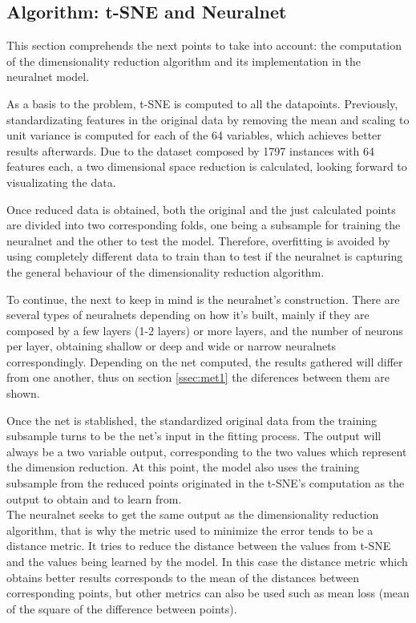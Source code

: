 \documentclass[a4paper,11pt,spanish]{report}
\begin{document}
\subsection{Algorithm: t-SNE and Neuralnet}
\label{ssec:dra}

This section comprehends the next points to take into account: the computation of the dimensionality reduction algorithm and its implementation in the neuralnet model.

As a basis to the problem, t-SNE is computed to all the datapoints. Previously, standardizating features in the original data by removing the mean and scaling to unit variance is computed for each of the 64 variables, which achieves better results afterwards. Due to the dataset composed by 1797 instances with 64 features each, a two dimensional space reduction is calculated, looking forward to visualizating the data.

Once reduced data is obtained, both the original and the just calculated points are divided into two corresponding folds, one being a subsample for training the neuralnet and the other to test the model. Therefore, overfitting is avoided by using completely different data to train than to test if the neuralnet is capturing the general behaviour of the dimensionality reduction algorithm.

To continue, the next to keep in mind is the neuralnet's construction. There are several types of neuralnets depending on how it's built, mainly if they are composed by a few layers (1-2 layers) or more layers, and the number of neurons per layer, obtaining shallow or deep and wide or narrow neuralnets correspondingly. Depending on the net computed, the results gathered will differ from one another, thus on section \ref{ssec:met1} the diferences between them are shown.

Once the net is stablished, the standardized original data from the training subsample turns to be the net's input in the fitting process. The output will always be a two variable output, corresponding to the two values which represent the dimension reduction. At this point, the model also uses the training subsample from the reduced points originated in the t-SNE's computation as the output to obtain and to learn from.\\
The neuralnet seeks to get the same output as the dimensionality reduction algorithm, that is why the metric used to minimize the error tends to be a distance metric. It tries to reduce the distance between the values from t-SNE and the values being learned by the model. In this case the distance metric which obtains better results corresponds to the mean of the distances between corresponding points, but other metrics can also be used such as mean loss (mean of the square of the difference between points).
\end{document}
